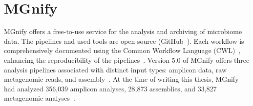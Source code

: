 \section{MGnify}\label{sec:MGnify-intro}

MGnify offers a free-to-use service for the analysis and archiving of microbiome data.
The pipelines and used tools are open source (GitHub~\cite{noauthor_mgnify_nodate-22}). Each workflow is comprehensively documented using the Common Workflow Language (CWL)~\cite{language_cwl_home_nodate}, enhancing the reproducibility of the pipelines~\cite{mitchell_mgnify_2020}. Version 5.0 of MGnify offers three analysis pipelines associated with distinct input types: amplicon data, raw metagenomic reads, and assembly~\cite{noauthor_mgnify_nodate-25}. At the time of writing this thesis, MGnify had analyzed 356,039 amplicon analyses, 28,873 assemblies, and 33,827 metagenomic analyses~\cite{noauthor_mgnify_nodate-23}.